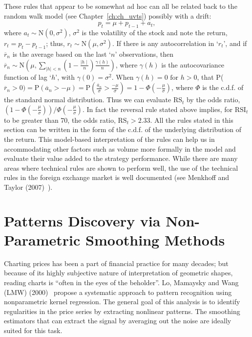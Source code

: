 These rules that appear to be somewhat ad hoc can all be related back to the random walk model (see Chapter~\ref{ch:ch_uvts}) possibly with a drift:
	\begin{equation} \label{eqn:anotherpt}
	p_t = \mu + p_{t-1} + a_t,
	\end{equation}
where $a_t \sim \text{N}(0,\sigma^2)$, $\sigma^2$ is the volatility of the stock and note the return, $r_t= p_t - p_{t-1}$; thus, $r_t \sim \text{N}(\mu,\sigma^2)$. If there is any autocorrelation in `$r_t$', and if $\overline{r}_n$ is the average based on the last `$n$' observations, then $\overline{r}_n \sim \text{N}\left(\mu,\sum_{\mid h \mid < n}\left(1-\frac{\mid h \mid}{n}\right)\frac{\gamma(h)}{n}\right)$, where $\gamma(h)$ is the autocovariance function of lag `$h$', with $\gamma(0)=\sigma^2$. When $\gamma(h)=0 \text{ for } h > 0$, that P($\overline{r}_n > 0)= \text{P}(\overline{a}_n > -\mu)= \text{P}\left( \frac{\overline{a}_n}{\sigma} > \frac{-\mu}{\sigma} \right)= 1 - \Phi\left( -\frac{\mu}{\sigma} \right)$, where $\Phi$ is the c.d.f. of the standard normal distribution. Thus we can evaluate $\text{RS}_t$ by the odds ratio, $\left(1 - \Phi\left(-\frac{\mu}{\sigma}\right)\right)/\Phi(-\frac{\mu}{\sigma})$. In fact the reversal rule stated above implies, for $\text{RSI}_t$ to be greater than 70, the odds ratio, $\text{RS}_t > 2.33$. All the rules stated in this section can be written in the form of the c.d.f. of the underlying distribution of the return. This model-based interpretation of the rules can help us in accommodating other factors such as volume more formally in the model and evaluate their value added to the strategy performance. While there are many areas where technical rules are shown to perform well, the use of the technical rules in the foreign exchange market is well documented (see Menkhoff and Taylor (2007)~\cite{MalTay}). \label{in:mva2}



\section{Patterns Discovery via Non-Parametric Smoothing Methods} \label{in:smoothing}

Charting prices has been a part of financial practice for many decades; but because of its highly subjective nature of interpretation of geometric shapes, reading charts is ``often in the eyes of the beholder''. Lo, Mamaysky and Wang (LMW) (2000)~\cite{LoMWang} propose a systematic approach to pattern recognition using nonparametric kernel regression. The general goal of this analysis is to identify regularities in the price series by extracting nonlinear patterns. The smoothing estimators that can extract the signal by averaging out the noise are ideally suited for this task.	


